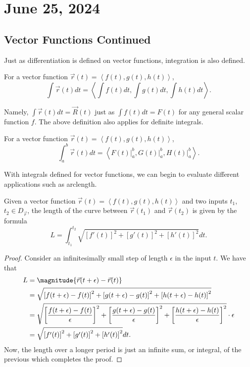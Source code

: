 \chapter{June 25, 2024}

\section{Vector Functions Continued}

Just as differentiation is defined on vector functions, integration is also defined.

\begin{proposition}
    For a vector function $\vec{r}(t) = \left<f(t), g(t), h(t)\right>$,
    \[\int \vec{r}(t)dt = \left<\int f(t)dt, \int g(t)dt, \int h(t)dt\right>.\]
\end{proposition}

Namely, $\int \vec{r}(t)dt = \vec{R}(t)$ just as $\int f(t)dt = F(t)$ for any general scalar function $f$. The above definition also applies for definite integrals.

\begin{proposition}
    For a vector function $\vec{r}(t) = \left<f(t), g(t), h(t)\right>$,
    \[\int_{a}^{b} \vec{r}(t)dt = \left<F(t) \biggr\vert_{a}^{b}, G(t) \biggr\vert_{a}^{b}, H(t) \biggr\vert_{a}^{b}\right>.\]
\end{proposition}

With integrals defined for vector functions, we can begin to evaluate different applications such as arclength.

\begin{theorem}
    Given a vector function $\vec{r}(t) = \left<f(t), g(t), h(t)\right>$ and two inputs $t_{1}$, $t_{2} \in D_{\vec{r}}$, the length of the curve between $\vec{r}(t_{1})$ and $\vec{r}(t_{2})$ is given by the formula
    \[L = \int_{t_{1}}^{t_{2}} \sqrt{\left[f'(t)\right]^{2} + \left[g'(t)\right]^{2} + \left[h'(t)\right]^{2}}dt.\]
\end{theorem}

\begin{proof}
    Consider an infinitesimally small step of length $\epsilon$ in the input $t$. We have that
    \begin{align*}
        L &= \magnitude{\vec{r}(t + \epsilon) - \vec{r}(t)} \\
        &= \sqrt{\left[f(t + \epsilon) - f(t)\right]^{2} + \left[g(t + \epsilon) - g(t)\right]^{2} + \left[h(t + \epsilon) - h(t)\right]^{2}} \\
        &= \sqrt{\left[\frac{f(t + \epsilon) - f(t)}{\epsilon}\right]^{2} + \left[\frac{g(t + \epsilon) - g(t)}{\epsilon}\right]^{2} + \left[\frac{h(t + \epsilon) - h(t)}{\epsilon}\right]^{2}} \cdot \epsilon \\
        &= \sqrt{\left[f'(t)\right]^{2} + \left[g'(t)\right]^{2} + \left[h'(t)\right]^{2}}dt.
    \end{align*}
    Now, the length over a longer period is just an infinite sum, or integral, of the previous which completes the proof.
\end{proof}

